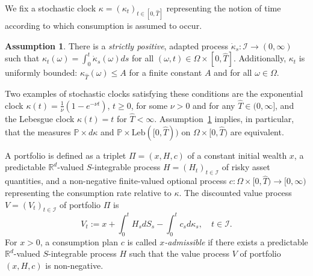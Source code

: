 \documentclass[11pt, oneside]{article}   	%
\theoremstyle{plain}
\theoremstyle{definition}
\newtheorem{assume}[thm]{Assumption}
\theoremstyle{remark}
\begin{document}
We fix a stochastic clock $\kappa=(\kappa_t)_{t\in[0,\hat{T}]}$ representing the notion of time according to which consumption is assumed to occur.
\begin{assume}\label{ass:clock}
There is a \textit{strictly positive}, adapted process $\dot{\kappa}_s:\mathcal{I}\to(0,\infty)$ such that
$\kappa_t(\omega)=\int_0^t \dot{\kappa}_s(\omega)ds$ for all $(\omega,t)\in\Omega\times[0,\hat{T}]$.
Additionally, $\kappa_t$ is uniformly bounded: $\kappa_{\hat{T}}(\omega)\leq A$ for a finite constant $A$ and for all $\omega\in\Omega$.
\end{assume}
Two examples of stochastic clocks satisfying these conditions are the exponential clock $\kappa(t)=\frac{1}{\nu}(1-e^{-\nu t})$, $t\geq 0$, for some $\nu>0$ and for any $\hat{T}\in(0,\infty]$, and the Lebesgue clock $\kappa(t)=t$ for $\hat{T}<\infty$. Assumption~\ref{ass:clock} implies, in particular, that the measures $\mathbb{P}\times d\kappa$ and $\mathbb{P}\times \text{Leb}([0,\hat{T}))$ on $\Omega\times[0,\hat{T})$ are equivalent.


A portfolio is defined as a triplet $\Pi=(x,H,c)$ of a constant initial wealth $x$, a predictable $\mathbb{R}^d$-valued $S$-integrable process $H=(H_t)_{t\in\mathcal{I}}$ of risky asset quantities, and a non-negative finite-valued optional process $c:\Omega\times[0,\hat{T})\to[0,\infty)$ representing the consumption rate relative to $\kappa$.
The discounted value process $V=(V_t)_{t\in\mathcal{I}}$ of portfolio $\Pi$ is
\begin{equation}\label{eq:wealth-process}
V_t:=x+\int_0^t H_sdS_s-\int_0^tc_sd\kappa_s,\quad t\in\mathcal{I}.
\end{equation}
For $x>0$, a consumption plan $c$ is called \textit{$x$-admissible} if there exists a predictable $\mathbb{R}^d$-valued $S$-integrable process $H$ such that the value process $V$ of portfolio $(x,H,c)$ is non-negative.
\end{document}
